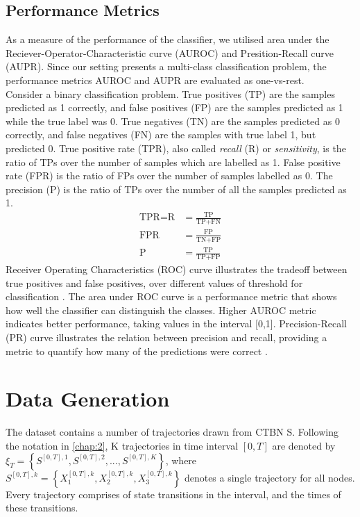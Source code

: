 \subsection{Performance Metrics}
As a measure of the performance of the classifier, we utilised area under the Reciever-Operator-Characteristic curve (AUROC) and Presition-Recall curve (AUPR). Since our setting presents a multi-class classification problem, the
performance metrics AUROC and AUPR are evaluated as one-vs-rest.\\
Consider a binary classification problem. True positives (TP) are the samples predicted as 1 correctly, and false positives (FP) are the samples predicted as 1 while the true label was 0. True negatives (TN) are the samples predicted as 0 correctly, and false negatives (FN) are the samples with true label 1, but predicted 0. True positive rate (TPR), also called \textit{recall} (R) or \textit{sensitivity}, is the ratio of TPs over the number of samples which are labelled as 1. False positive rate (FPR) is the ratio of FPs over the number of samples labelled as 0. The precision (P) is the ratio of TPs over the number of all the samples predicted as 1.
\begin{align}
\text{TPR} = \text{R} &= \frac{\text{TP}}{\text{TP} + \text{FN}} \\
\text{FPR} &= \frac{\text{FP}}{\text{TN} + \text{FP}} \\
\text{P} &= \frac{\text{TP}}{\text{TP} + \text{FP}}
\end{align}
Receiver Operating Characteristics (ROC) curve illustrates the tradeoff between true positives and false positives, over different values of threshold for classification \cite{kerekes2008receiver}. The area under ROC curve is a performance metric that shows how well the classifier can distinguish the classes. Higher AUROC metric indicates better performance, taking values in the interval [0,1]. Precision-Recall (PR) curve illustrates the relation between precision and recall, providing a metric to quantify how many of the predictions were correct \cite{Boyd2013}.
\section{Data Generation}
The dataset contains a number of trajectories drawn from CTBN S. Following the notation in \cref{chap:2}, K trajectories in time interval $ [0, T] $ are denoted by $ \xi_T = \left\lbrace S^{[0,T], 1}, S^{[0,T], 2}, ..., S^{[0,T], K} \right\rbrace  $, where $ S^{[0,T],k} = \left\lbrace X_1^{[0,T],k} , X_2^{[0,T],k}, X_3^{[0,T],k}\right\rbrace $ denotes a single trajectory for all nodes. Every trajectory comprises of state transitions in the interval, and the times of these transitions. 
